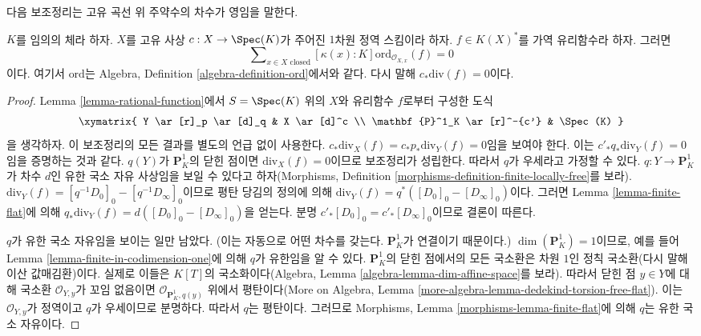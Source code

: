 \noindent
다음 보조정리는 고유 곡선 위 주약수의 차수가 영임을 말한다.

\begin{lemma}
\label{lemma-curve-principal-divisor}
$K$를 임의의 체라 하자. $X$를 고유 사상
$c : X \to \Spec(K)$가 주어진 $1$차원 정역 스킴이라 하자.
$f \in K(X)^*$를 가역 유리함수라 하자. 그러면
$$
\sum\nolimits_{x \in X \text{ closed}}
[\kappa(x) : K] \text{ord}_{\mathcal{O}_{X, x}}(f)
=
0
$$
이다. 여기서 $\text{ord}$는 Algebra, Definition
\ref{algebra-definition-ord}에서와 같다. 다시 말해
$c_*\text{div}(f) = 0$이다.
\end{lemma}

\begin{proof}
Lemma \ref{lemma-rational-function}에서 $S = \Spec(K)$ 위의 $X$와 유리함수
$f$로부터 구성한 도식
$$
\xymatrix{
Y \ar[r]_p \ar[d]_q & X \ar[d]^c \\
\mathbf{P}^1_K \ar[r]^-{c'} & \Spec(K)
}
$$
을 생각하자. 이 보조정리의 모든 결과를 별도의 언급 없이 사용한다.
$c_*\text{div}_X(f) = c_*p_*\text{div}_Y(f) = 0$임을 보여야 한다.
이는 $c'_*q_*\text{div}_Y(f) = 0$임을 증명하는 것과 같다.
$q(Y)$가 $\mathbf{P}^1_K$의 닫힌 점이면
$\text{div}_X(f) = 0$이므로 보조정리가 성립한다. 따라서 $q$가
우세라고 가정할 수 있다. $q : Y \to \mathbf{P}^1_K$가 차수 $d$인
유한 국소 자유 사상임을 보일 수 있다고 하자(Morphisms, Definition
\ref{morphisms-definition-finite-locally-free}를 보라).
$\text{div}_Y(f) = [q^{-1}D_0]_0 - [q^{-1}D_\infty]_0$이므로 평탄 당김의
정의에 의해
$\text{div}_Y(f) = q^*([D_0]_0 - [D_\infty]_0)$이다. 그러면 Lemma
\ref{lemma-finite-flat}에 의해
$q_*\text{div}_Y(f) = d([D_0]_0 - [D_\infty]_0)$을 얻는다. 분명
$c'_*[D_0]_0 = c'_*[D_\infty]_0$이므로 결론이 따른다.

\medskip\noindent
$q$가 유한 국소 자유임을 보이는 일만 남았다. (이는 자동으로 어떤
차수를 갖는다. $\mathbf{P}^1_K$가 연결이기 때문이다.)
$\dim(\mathbf{P}^1_K) = 1$이므로, 예를 들어 Lemma
\ref{lemma-finite-in-codimension-one}에 의해 $q$가 유한임을 알 수 있다.
$\mathbf{P}^1_K$의 닫힌 점에서의 모든 국소환은 차원 $1$인 정칙
국소환(다시 말해 이산 값매김환)이다. 실제로 이들은 $K[T]$의
국소화이다(Algebra, Lemma \ref{algebra-lemma-dim-affine-space}를 보라).
따라서 닫힌 점 $y\in Y$에 대해 국소환
$\mathcal{O}_{Y, y}$가 꼬임 없음이면
$\mathcal{O}_{\mathbf{P}^1_K, q(y)}$ 위에서 평탄이다(More on Algebra,
Lemma \ref{more-algebra-lemma-dedekind-torsion-free-flat}). 이는
$\mathcal{O}_{Y, y}$가 정역이고 $q$가 우세이므로 분명하다. 따라서
$q$는 평탄이다. 그러므로 Morphisms, Lemma
\ref{morphisms-lemma-finite-flat}에 의해 $q$는 유한 국소 자유이다.
\end{proof}





